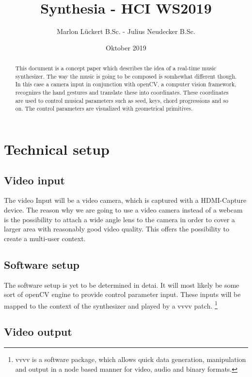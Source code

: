 \documentclass[titlepage, a4paper, 11pt]{scrartcl}
\begin{document}
\title{Synthesia - HCI WS2019}
\author{Marlon Lückert B.Sc. - Julius Neudecker B.Sc.}
\date{Oktober 2019}
\maketitle

\begin{abstract}
This document is a concept paper which describes the idea of a real-time music synthesizer. The way the music is going to be composed is somhewhat different though.
In this case a camera input in conjunction with openCV, a computer vision framework, recognizes the hand gestures and translate these into coordinates.
These coordinates are used to control musical parameters such as seed, keys, chord progressions and so on. The control parameters are visualized with geometrical primitives.
\end{abstract}

\tableofcontents

\pagebreak

\section{Technical setup}

\subsection{Video input} \label{videoinput}

The video Input will be a video camera, which is captured with a HDMI-Capture device. The reason why we are going to use a video camera instead of a webcam is the possibility
to attach a wide angle lens to the camera in order to cover a larger area with reasonably good video quality. This offers the possibility to create a multi-user context.
    

\subsection{Software setup}

The software setup is yet to be determined in detai. It will most likely be some sort of openCV engine to provide 
control parameter input. These inputs will be mapped to the context of the synthesizer and played by a vvvv patch.
\footnote{vvvv is a software package, which allows quick data generation, manipulation and output in a node based manner for video, audio and binary formats.}

\subsection{Video output}
\end{document}
